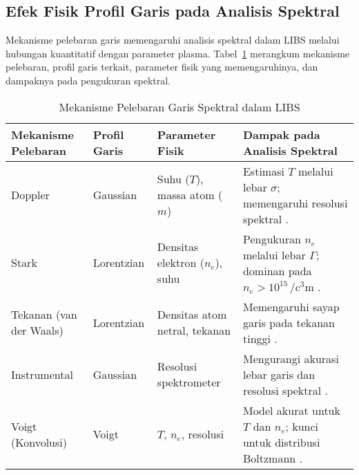 \subsection{Efek Fisik Profil Garis pada Analisis Spektral}
Mekanisme pelebaran garis memengaruhi analisis spektral dalam LIBS melalui hubungan kuantitatif dengan parameter plasma. Tabel~\ref{tab:broadening_effects} merangkum mekanisme pelebaran, profil garis terkait, parameter fisik yang memengaruhinya, dan dampaknya pada pengukuran spektral.

\begin{table}[H]
\centering
\caption{Mekanisme Pelebaran Garis Spektral dalam LIBS}
\label{tab:broadening_effects}
\begin{tabularx}{\textwidth}{XXXX}
\toprule
\textbf{Mekanisme Pelebaran} & \textbf{Profil Garis} & \textbf{Parameter Fisik} & \textbf{Dampak pada Analisis Spektral} \\
\midrule
Doppler & Gaussian & Suhu (\( T \)), massa atom (\( m \)) & Estimasi \( T \) melalui lebar \( \sigma \); memengaruhi resolusi spektral \citep{Demtroder2010}. \\
Stark & Lorentzian & Densitas elektron (\( n_e \)), suhu & Pengukuran \( n_e \) melalui lebar \( \Gamma \); dominan pada \( n_e > 10^{15} \, \si{\per\cubic\centi\meter} \) \citep{Griem1997,Konjevic1999}. \\
Tekanan (van der Waals) & Lorentzian & Densitas atom netral, tekanan & Memengaruhi sayap garis pada tekanan tinggi \citep{Konjevic1999}. \\
Instrumental & Gaussian & Resolusi spektrometer & Mengurangi akurasi lebar garis dan resolusi spektral \citep{Miziolek2006}. \\
Voigt (Konvolusi) & Voigt & \( T \), \( n_e \), resolusi & Model akurat untuk \( T \) dan \( n_e \); kunci untuk distribusi Boltzmann \citep{Aragon2008}. \\
\bottomrule
\end{tabularx}
\end{table}

